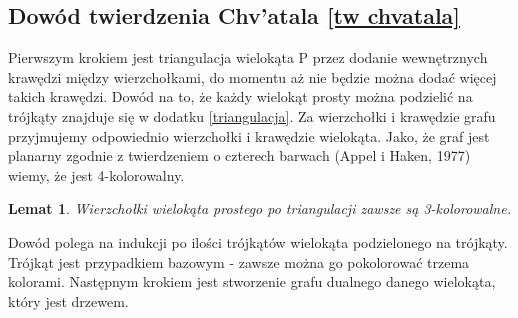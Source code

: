 \documentclass[brudnopis]{xmgr}
\newtheorem{Lemat}{Lemat}
\begin{document}
\subsection{Dowód twierdzenia Chv'atala \ref{tw chvatala}}
Pierwszym krokiem jest triangulacja wielokąta P przez dodanie wewnętrznych krawędzi między wierzchołkami, do momentu aż nie będzie można dodać więcej takich krawędzi. %
Dowód na to, że każdy wielokąt prosty można podzielić na trójkąty znajduje się w dodatku \ref{triangulacja}.
Za wierzchołki i krawędzie grafu przyjmujemy odpowiednio wierzchołki i krawędzie wielokąta. Jako, że graf jest planarny zgodnie z twierdzeniem o czterech barwach (Appel i Haken, 1977) wiemy, że jest 4-kolorowalny.
\begin{Lemat}
Wierzchołki wielokąta prostego po triangulacji zawsze są 3-kolorowalne.
\end{Lemat}
Dowód polega na indukcji po ilości trójkątów wielokąta podzielonego na trójkąty. Trójkąt jest przypadkiem bazowym - zawsze można go pokolorować trzema kolorami. Następnym krokiem jest stworzenie grafu dualnego danego wielokąta, który jest drzewem.
\end{document}
